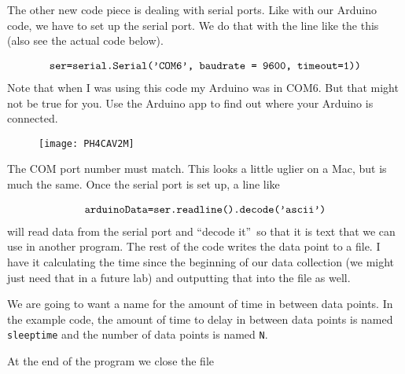 The other new code piece is dealing with serial ports. Like with our Arduino
code, we have to set up the serial port. We do that with the line like the
this (also see the actual code below).

\begin{equation*}
\begin{tabular}{l}
\texttt{ser=serial.Serial('COM6', baudrate = 9600, timeout=1))}%
\end{tabular}%
\end{equation*}%
Note that when I was using this code my Arduino was in COM6. But that might
not be true for you. Use the Arduino app to find out where your Arduino is
connected. \begin{figure}[h!]
\texttt{[image: PH4CAV2M]}
\end{figure}

The COM port number must match. This looks a little uglier on a Mac, but is
much the same. Once the serial port is set up, a line like

\begin{equation*}
\begin{tabular}{l}
\texttt{arduinoData=ser.readline().decode('ascii')}%
\end{tabular}%
\end{equation*}%
will read data from the serial port and \textquotedblleft decode
it\textquotedblright\ so that it is text that we can use in another program.
The rest of the code writes the data point to a file. I have it calculating
the time since the beginning of our data collection (we might just need that
in a future lab) and outputting that into the file as well.

We are going to want a name for the amount of time in between data points.
In the example code, the amount of time to delay in between data points is
named \texttt{sleeptime} and the number of data points is named \texttt{N}.

At the end of the program we close the file

